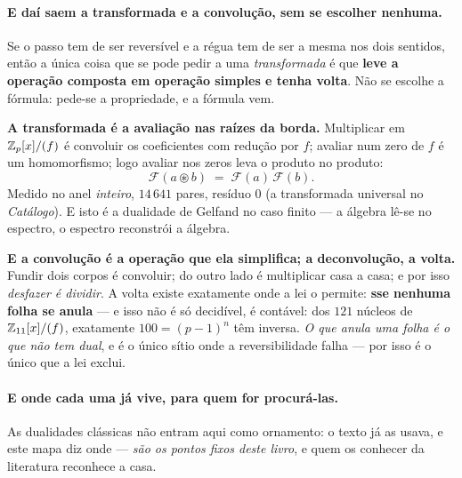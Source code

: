 \documentclass[livro.tex]{subfiles}
\begin{document}
\paragraph{E daí saem a transformada e a convolução, sem se escolher nenhuma.} Se o passo tem de
ser reversível e a régua tem de ser a mesma nos dois sentidos, então a única coisa que se pode
pedir a uma \emph{transformada} é que \textbf{leve a operação composta em operação simples e tenha
volta}. Não se escolhe a fórmula: pede-se a propriedade, e a fórmula vem.

\smallskip
\noindent \textbf{A transformada é a avaliação nas raízes da borda.} Multiplicar em $\mathbb Z_p[x]/(f)$ é
convoluir os coeficientes com redução por $f$; avaliar num zero de $f$ é um homomorfismo; logo
avaliar nos zeros leva o produto no produto:
\[
  \mathcal F(a\circledast b) \;=\; \mathcal F(a)\,\mathcal F(b) .
\]
Medido no anel \emph{inteiro}, $14\,641$ pares, resíduo $0$ (a transformada universal no \emph{Catálogo}). E isto é a
dualidade de Gelfand no caso finito --- a álgebra lê-se no espectro, o espectro reconstrói a
álgebra.

\smallskip
\noindent \textbf{E a convolução é a operação que ela simplifica; a deconvolução, a volta.} Fundir
dois corpos é convoluir; do outro lado é multiplicar casa a casa; e por isso \emph{desfazer é
dividir}. A volta existe exatamente onde a lei o permite: \textbf{sse nenhuma folha se anula} --- e
isso não é só decidível, é contável: dos $121$ núcleos de $\mathbb Z_{11}[x]/(f)$, exatamente
$100=(p-1)^n$ têm inversa. \emph{O que anula uma folha é o que não tem dual}, e é o único sítio
onde a reversibilidade falha --- por isso é o único que a lei exclui.

\paragraph{E onde cada uma já vive, para quem for procurá-las.} As dualidades clássicas não
entram aqui como ornamento: o texto já as usava, e este mapa diz onde --- \emph{são os pontos fixos
deste livro}, e quem os conhecer da literatura reconhece a casa.
\end{document}
